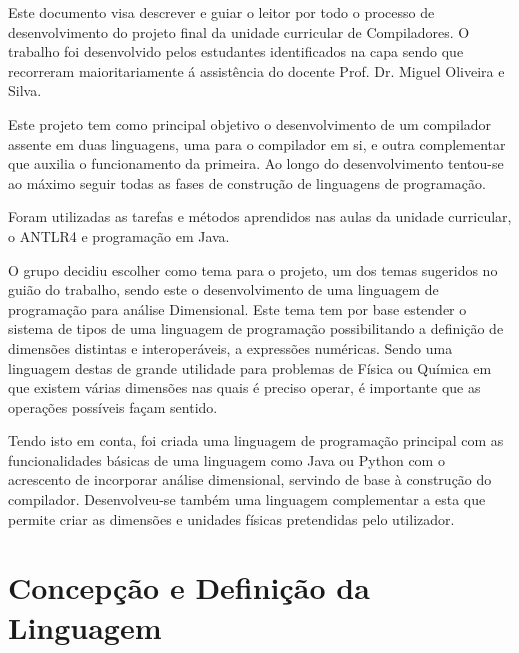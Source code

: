 \documentclass[10pt,portuguese]{article}
\begin{document}
\par Este documento visa descrever e guiar o leitor por todo o processo de desenvolvimento do projeto final da unidade curricular de Compiladores. O trabalho foi desenvolvido pelos estudantes identificados na capa sendo que recorreram maioritariamente á assistência do docente Prof. Dr. Miguel Oliveira e Silva.
\par Este projeto tem como principal objetivo o desenvolvimento de um compilador assente em duas linguagens, uma para o compilador em si, e outra complementar que auxilia o funcionamento da primeira. Ao longo do desenvolvimento tentou-se ao máximo seguir todas as fases de construção de linguagens de programação.
\par Foram utilizadas as tarefas e métodos aprendidos nas aulas da unidade curricular, o ANTLR4 e programação em Java.
\par O grupo decidiu escolher como tema para o projeto, um dos temas sugeridos no guião do trabalho, sendo este o desenvolvimento de uma linguagem de programação para análise Dimensional. Este tema tem por base estender o sistema de tipos de uma linguagem de programação possibilitando a definição de dimensões distintas e interoperáveis, a expressões numéricas. Sendo uma linguagem destas de grande utilidade para problemas de Física ou Química em que existem várias dimensões nas quais é preciso operar, é importante que as operações possíveis façam sentido.
\par Tendo isto em conta, foi criada uma linguagem de programação principal com as funcionalidades básicas de uma linguagem como Java ou Python com o acrescento de incorporar análise dimensional, servindo de base à construção do compilador. Desenvolveu-se também uma linguagem complementar a esta que permite criar as dimensões e unidades físicas pretendidas pelo utilizador.

\newpage
\section{Concepção e Definição da Linguagem}
\end{document}
